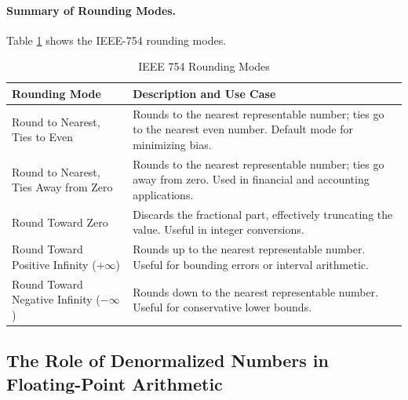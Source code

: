 \paragraph{Summary of Rounding Modes.}
Table \ref{tab:rounding_modes} shows the IEEE-754 rounding modes.
\begin{table}[h!]
\centering
\renewcommand{\arraystretch}{1.3} %
\setlength{\tabcolsep}{6pt} %
\caption{IEEE 754 Rounding Modes}
\label{tab:rounding_modes}
\begin{tabular}{|p{4cm}|p{8cm}|}
\hline
\textbf{Rounding Mode}                 & \textbf{Description and Use Case}                                                                                     \\ \hline
Round to Nearest, Ties to Even         & Rounds to the nearest representable number; ties go to the nearest even number. Default mode for minimizing bias.     \\ \hline
Round to Nearest, Ties Away from Zero  & Rounds to the nearest representable number; ties go away from zero. Used in financial and accounting applications.     \\ \hline
Round Toward Zero                      & Discards the fractional part, effectively truncating the value. Useful in integer conversions.                         \\ \hline
Round Toward Positive Infinity (\(+\infty\)) & Rounds up to the nearest representable number. Useful for bounding errors or interval arithmetic.                     \\ \hline
Round Toward Negative Infinity (\(-\infty\)) & Rounds down to the nearest representable number. Useful for conservative lower bounds.                                 \\ \hline
\end{tabular}
\end{table}



\subsection{The Role of Denormalized Numbers in Floating-Point Arithmetic}

